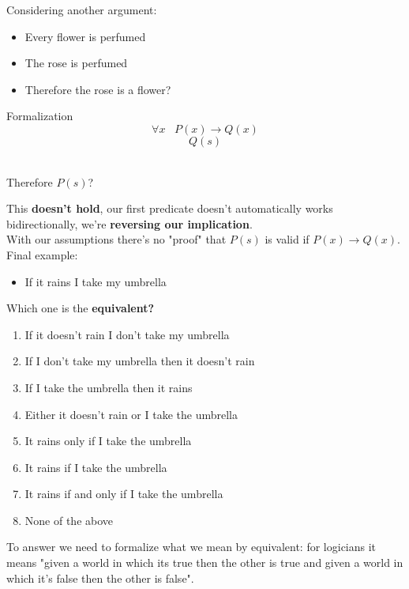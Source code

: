 \documentclass[11pt]{article}
\begin{document}
	\newpage
	
	Considering another argument:
	\begin{itemize}
		\item Every flower is perfumed 
		\item The rose is perfumed
		\\ \bline
		\item Therefore the rose is a flower? 
	\end{itemize}
	
	Formalization
	$$\forall x\;\;\; P(x) \rightarrow Q(x)$$
	$$Q(s)$$
	\begin{center}
		\bline \\
		Therefore $P(s)$? \\
	\end{center}
	
	
	This \textbf{doesn't hold}, our first predicate doesn't automatically works bidirectionally, we're \textbf{reversing our implication}. \\
	With our assumptions there's no "proof" that $P(s)$ is valid if 
	$P(x) \rightarrow Q(x)$. \\
	
	Final example: 
	\begin{itemize}
		\item If it rains I take my umbrella
	\end{itemize}
	
	Which one is the \textbf{equivalent?}
	\begin{enumerate}
		\item If it doesn't rain I don't take my umbrella 
		\item If I don't take my umbrella then it doesn't rain 
		\item If I take the umbrella then it rains 
		\item Either it doesn't rain or I take the umbrella
		\item It rains only if I take the umbrella
		\item It rains if I take the umbrella 
		\item It rains if and only if I take the umbrella
		\item None of the above 
	\end{enumerate}
	
	To answer we need to formalize what we mean by equivalent: for logicians it means "given a world in which its true then the other is true and given a world in which it's false then the other is false". \\
	
\end{document}
